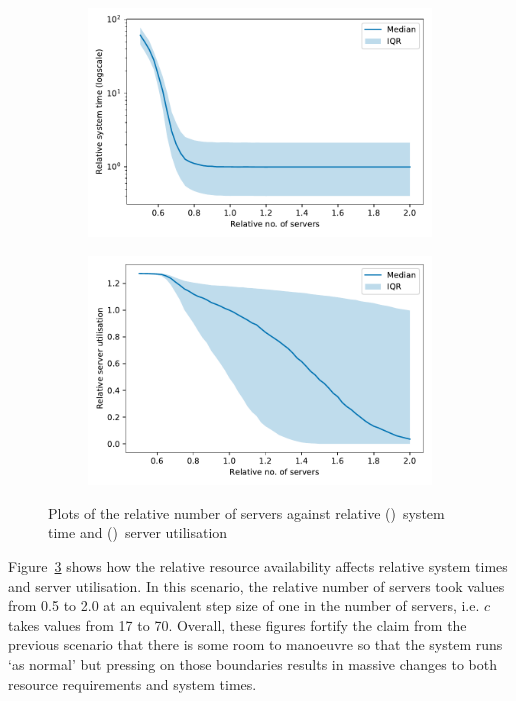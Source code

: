 \begin{figure}
    \centering
    \begin{subfigure}{\imgwidth}
        \includegraphics[width=\linewidth]{servers_time}
        \caption{}\label{fig:servers_time}
    \end{subfigure}

    \begin{subfigure}{\imgwidth}
        \includegraphics[width=\linewidth]{servers_util}
        \caption{}\label{fig:servers_util}
    \end{subfigure}
    \caption{%
        Plots of the relative number of servers against relative
        ()~system time and
        ()~server utilisation
    }\label{fig:servers}
\end{figure}

Figure~\ref{fig:servers} shows how the relative resource availability affects
relative system times and server utilisation. In this scenario, the relative
number of servers took values from 0.5 to 2.0 at an equivalent step size of one
in the number of servers, i.e. \(c\) takes values from 17 to 70. Overall, these
figures fortify the claim from the previous scenario that there is some room to
manoeuvre so that the system runs `as normal' but pressing on those boundaries
results in massive changes to both resource requirements and system times.

